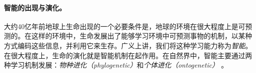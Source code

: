 \documentclass[../../book-main_zh.tex]{subfiles}
\begin{document}
\paragraph{智能的出现与演化。}

大约40亿年前地球上生命出现的一个必要条件是，地球的环境在很大程度上是可预测的。在这样的环境中，生命发展出了能够学习环境中可预测事物的机制，以某种方式编码这些信息，并利用它来生存。广义上讲，我们将这种学习能力称为{\em 智能}。在很大程度上，生命的演化就是智能机制在起作用。在自然界中，智能主要通过两种学习机制发展：{\em 物种进化（phylogenetic）}和{\em 个体进化（ontogenetic）} \cite{Wiener-Cybernetics-1961}。%
\end{document}
